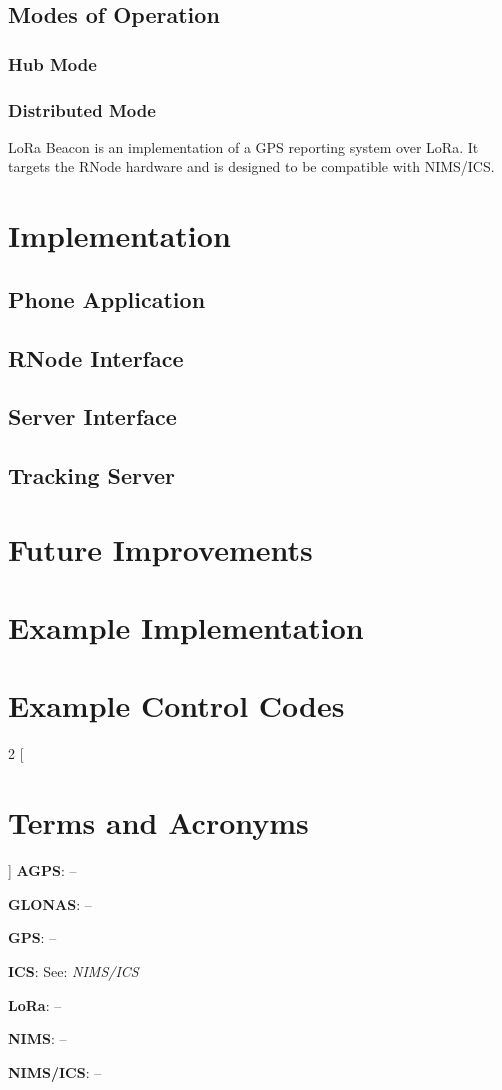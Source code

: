 \documentclass[12pt,letterpaper,twoside]{report}
\newcommand{\term}[2]{\noindent\hangindent=0.7cm\textbf{#1}: {#2}\par}
\begin{document}
\section{Modes of Operation}

\subsection{Hub Mode}

\subsection{Distributed Mode}
LoRa Beacon is an implementation of a GPS reporting system over LoRa. It targets the RNode hardware and is designed to be compatible with NIMS/ICS.

\chapter{Implementation}

\section{Phone Application}

\section{RNode Interface}

\section{Server Interface}

\section{Tracking Server}

\chapter{Future Improvements}

\chapter{Example Implementation}

\chapter{Example Control Codes}



\begin{multicols}{2}
[
\chapter{Terms and Acronyms}
{ }
]
\term{AGPS}{--}
\term{GLONAS}{--}
\term{GPS}{--}
\term{ICS}{See: \textit{NIMS/ICS}}
\term{LoRa}{--}
\term{NIMS}{--}
\term{NIMS/ICS}{--}


\end{multicols}
\end{document}
